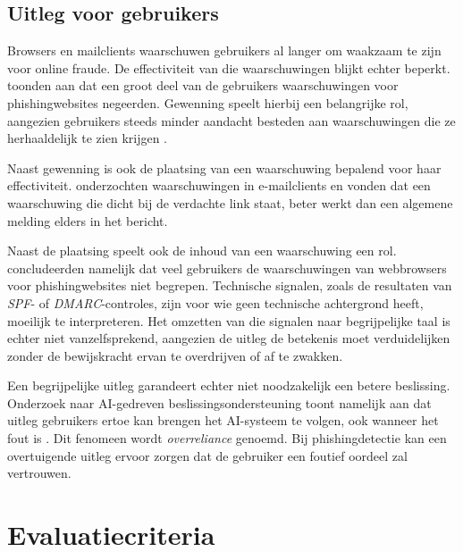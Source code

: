 \subsection{Uitleg voor gebruikers}%
\label{subsec:uitleg-voor-gebruikers}

Browsers en mailclients waarschuwen gebruikers al langer om waakzaam te zijn voor online fraude. De effectiviteit van die waarschuwingen blijkt echter beperkt. \textcite{Egelman2008} toonden aan dat een groot deel van de gebruikers waarschuwingen voor phishingwebsites negeerden. Gewenning speelt hierbij een belangrijke rol, aangezien gebruikers steeds minder aandacht besteden aan waarschuwingen die ze herhaaldelijk te zien krijgen \autocite{Anderson2015}.

Naast gewenning is ook de plaatsing van een waarschuwing bepalend voor haar effectiviteit. \textcite{Petelka2019} onderzochten waarschuwingen in e-mailclients en vonden dat een waarschuwing die dicht bij de verdachte link staat, beter werkt dan een algemene melding elders in het bericht.

Naast de plaatsing speelt ook de inhoud van een waarschuwing een rol. \textcite{Egelman2008} concludeerden namelijk dat veel gebruikers de waarschuwingen van webbrowsers voor phishingwebsites niet begrepen. Technische signalen, zoals de resultaten van \emph{SPF}- of \emph{DMARC}-controles, zijn voor wie geen technische achtergrond heeft, moeilijk te interpreteren. Het omzetten van die signalen naar begrijpelijke taal is echter niet vanzelfsprekend, aangezien de uitleg de betekenis moet verduidelijken zonder de bewijskracht ervan te overdrijven of af te zwakken.

Een begrijpelijke uitleg garandeert echter niet noodzakelijk een betere beslissing. Onderzoek naar AI-gedreven beslissingsondersteuning toont namelijk aan dat uitleg gebruikers ertoe kan brengen het AI-systeem te volgen, ook wanneer het fout is \autocite{Bucinca2021}. Dit fenomeen wordt \emph{overreliance} genoemd. Bij phishingdetectie kan een overtuigende uitleg ervoor zorgen dat de gebruiker een foutief oordeel zal vertrouwen.

\section{Evaluatiecriteria}%
\label{sec:evaluatiecriteria}

